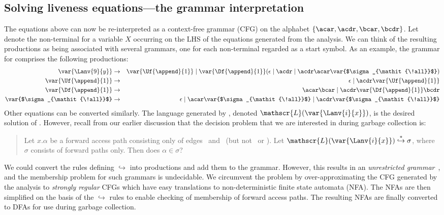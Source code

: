 \subsection{Solving liveness equations---the grammar interpretation}
The  equations above can now be re-interpreted as a
context-free grammar (CFG)  on the alphabet $\lbrace\acar, \acdr,
\bcar, \bcdr\rbrace$.  Let   denote the non-terminal for
a variable  $X$ occurring on  the LHS of the  equations generated
from the analysis.  We can  think of the resulting productions as
being associated with several  grammars, one for each non-terminal
 regarded as a start symbol.  As an example, the
grammar    for      comprises    the   following
productions:
 \begin{eqnarray*}
\var{\Lanv{9}{y}}  &\rightarrow&  \var{\Uf{\append}{1}} \mid  \var{\Df
  {\append}{1}}        (\epsilon         \mid        \acdr        \mid
 \acdr\acar\var{$\sigma_{\mathit{\!all}}$})\\
  \var{\Uf{\append}{1}}    &\rightarrow&    \epsilon   \mid
  \acdr\var{\Uf{\append}{1}}\\         
  \var{\Df{\append}{1}}
  &\rightarrow&               \acar\bcar               \mid
  \acdr\var{\Df{\append}{1}}\bcdr\\
\var{$\sigma_{\mathit{\!all}}$} &\rightarrow & \epsilon \mid \acar
\var{$\sigma_{\mathit{\!all}}$} \mid \acdr
\var{$\sigma_{\mathit{\!all}}$}
\end{eqnarray*}
Other equations can be converted  similarly.     The  language  generated  by  ,
denoted $\mathscr{L}(\var{\Lanv{i}{x}})
$,  is the desired  solution of
.   
However, recall from  our earlier  discussion that
the  decision problem that  we are  interested in  during garbage
collection is:
\begin{quote}
Let $x.\alpha$ be  a forward  access path  consisting  only  of   edges
\acar\  and \acdr\  (but  not \bcar\  or  \bcdr).   Let              $\mathscr{L}(\var{\Lanv{i}{x}})
\stackrel{*}{\hookrightarrow} \sigma$, where  $\sigma$  consists 
of forward paths only. Then does $\alpha \in \sigma$?
\end{quote}
We could convert  the  rules  defining  $\hookrightarrow$  into
productions and  add them to the grammar. However, this results
in  an {\em  unrestricted grammar}~\cite{hopcraft90toc},  and the
membership  problem   for  such  grammars   is  undecidable.   We
circumvent the problem by over-approximating the CFG generated by the analysis to  {\em
  strongly  regular}  CFGs which  have   easy
translations to non-deterministic finite state automata (NFA). The
NFAs are then simplified on the
basis  of  the  $\hookrightarrow$  rules to  enable  checking  of
membership of forward access paths. The resulting NFAs are   finally
converted to DFAs for use during garbage collection.
